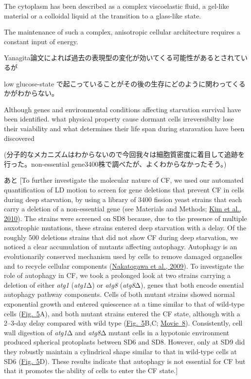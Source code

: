 The cytoplasm has been described as a complex viscoelastic fluid, a gel-like material or a colloidal liquid at the transition to a glass-like state.\cite{nishizawa2017universal}

The maintenance of such a complex, anisotropic cellular architecture requires a constant input of energy. \cite{ebata2023activity}

Yanagita論文によれば過去の表現型の変化が効いてくる可能性があるとされているが

low glucose-state で起こっていることがその後の生存にどのように関わってくるかがわからない。 

Although genes and environmental conditions affecting starvation survival have been identified. what physical property cause dormant cells irreversibilty lose their vaiability and what determines their life span during staravation have been discovered

(分子的なメカニズムはわからないので今回我々は細胞質密度に着目して追跡を行った。non-essential gene3400株で調べたが、よくわからなかったそう。)

あと\cite{allen2006isolation}
[To further investigate the molecular nature of CF, we used our automated quantification of LD motion to screen for gene deletions that prevent CF in cells during deep starvation, by using a library of 3400 fission yeast strains that each carry a deletion of a non-essential gene (see Materials and Methods; \href{https://pmc.ncbi.nlm.nih.gov/articles/PMC6857596/\#JCS231688C32}{Kim et al., 2010}). The strains were screened on SD8 because, due to the presence of multiple auxotrophic mutations, these strains entered deep starvation with a delay. Of the roughly 500 deletions strains that did not show CF during deep starvation, we noticed a clear accumulation of mutants affecting autophagy. Autophagy is an evolutionarily conserved mechanism used by cells to remove damaged organelles and to recycle cellular components (\href{https://pmc.ncbi.nlm.nih.gov/articles/PMC6857596/\#JCS231688C52}{Nakatogawa et al., 2009}). To investigate the role of autophagy in CF, we took a prolonged look at two strains carrying a deletion of either \textit{atg1} (\textit{atg1}Δ) or \textit{atg8} (\textit{atg8}Δ), genes that both encode essential autophagy pathway components. Cells of both mutant strains showed normal exponential growth and entered quiescence at a time similar to that of wild-type cells (\href{https://pmc.ncbi.nlm.nih.gov/articles/PMC6857596/\#JCS231688F5}{Fig. 5}A), and both mutant strains entered the CF state, although with a 2–3-day delay compared with wild type (\href{https://pmc.ncbi.nlm.nih.gov/articles/PMC6857596/\#JCS231688F5}{Fig. 5}B,C; \href{http://movie.biologists.com/video/10.1242/jcs.231688/video-8}{Movie 8}). Consistently, cell wall digestion of \textit{atg1}Δ and \textit{atg8}Δ mutant cells in a hypotonic environment produced spherical protoplasts between SD6 and SD8. However, only at SD9 did they robustly maintain a cylindrical shape similar to that in wild-type cells at SD6 (\href{https://pmc.ncbi.nlm.nih.gov/articles/PMC6857596/\#JCS231688F5}{Fig. 5}D). These results indicate that autophagy is not essential for CF but that it promotes the ability of cells to enter the CF state.]

